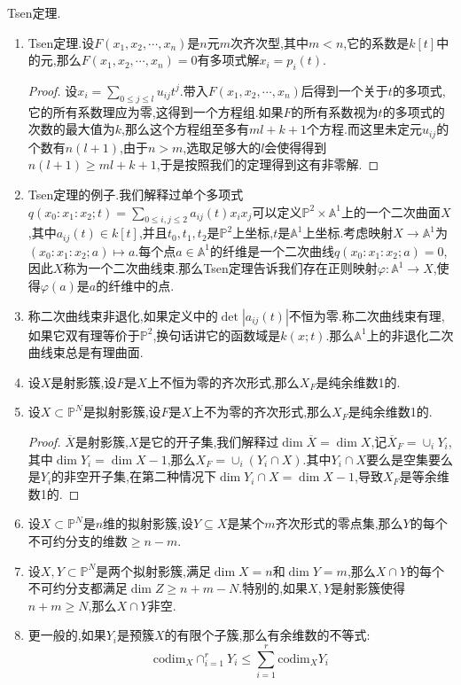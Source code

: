 Tsen定理.
\begin{enumerate}
	\item Tsen定理.设$F(x_1,x_2,\cdots,x_n)$是$n$元$m$次齐次型,其中$m<n$,它的系数是$k[t]$中的元,那么$F(x_1,x_2,\cdots,x_n)=0$有多项式解$x_i=p_i(t)$.
	\begin{proof}
		
		设$x_i=\sum_{0\le j\le l}u_{ij}t^j$.带入$F(x_1,x_2,\cdots,x_n)$后得到一个关于$t$的多项式,它的所有系数理应为零,这得到一个方程组.如果$F$的所有系数视为$t$的多项式的次数的最大值为$k$,那么这个方程组至多有$ml+k+1$个方程.而这里未定元$u_{ij}$的个数有$n(l+1)$,由于$n>m$,选取足够大的$l$会使得得到$n(l+1)\ge ml+k+1$,于是按照我们的定理得到这有非零解.
	\end{proof}
	\item Tsen定理的例子.我们解释过单个多项式$q(x_0:x_1:x_2;t)=\sum_{0\le i,j\le2}a_{ij}(t)x_ix_j$可以定义$\mathbb{P}^2\times\mathbb{A}^1$上的一个二次曲面$X$,其中$a_{ij}(t)\in k[t]$,并且$t_0,t_1,t_2$是$\mathbb{P}^2$上坐标,$t$是$\mathbb{A}^1$上坐标.考虑映射$X\to\mathbb{A}^1$为$(x_0:x_1:x_2;a)\mapsto a$.每个点$a\in\mathbb{A}^1$的纤维是一个二次曲线$q(x_0:x_1:x_2;a)=0$,因此$X$称为一个二次曲线束.那么Tsen定理告诉我们存在正则映射$\varphi:\mathbb{A}^1\to X$,使得$\varphi(a)$是$a$的纤维中的点.
	\item 称二次曲线束非退化,如果定义中的$\det|a_{ij}(t)|$不恒为零.称二次曲线束有理,如果它双有理等价于$\mathbb{P}^2$,换句话讲它的函数域是$k(x;t)$.那么$\mathbb{A}^1$上的非退化二次曲线束总是有理曲面.
	\item 设$X$是射影簇,设$F$是$X$上不恒为零的齐次形式,那么$X_F$是纯余维数1的.
	\item 设$X\subset\mathbb{P}^N$是拟射影簇,设$F$是$X$上不为零的齐次形式,那么$X_F$是纯余维数1的.
	\begin{proof}
		
		$\overline{X}$是射影簇,$X$是它的开子集,我们解释过$\dim\overline{X}=\dim X$,记$\overline{X}_F=\cup_iY_i$,其中$\dim Y_i=\dim X-1$,那么$X_F=\cup_i(Y_i\cap X)$.其中$Y_i\cap X$要么是空集要么是$Y_i$的非空开子集,在第二种情况下$\dim Y_i\cap X=\dim X-1$,导致$X_F$是等余维数1的.
	\end{proof}
    \item 设$X\subset\mathbb{P}^N$是$n$维的拟射影簇,设$Y\subseteq X$是某个$m$齐次形式的零点集,那么$Y$的每个不可约分支的维数$\ge n-m$.
    \item 设$X,Y\subset\mathbb{P}^N$是两个拟射影簇,满足$\dim X=n$和$\dim Y=m$,那么$X\cap Y$的每个不可约分支都满足$\dim Z\ge n+m-N$.特别的,如果$X,Y$是射影簇使得$n+m\ge N$,那么$X\cap Y$非空.
    \item 更一般的,如果$Y_i$是预簇$X$的有限个子簇,那么有余维数的不等式:
    $$\mathrm{codim}_X\cap_{i=1}^rY_i\le\sum_{i=1}^r\mathrm{codim}_XY_i$$
\end{enumerate}

